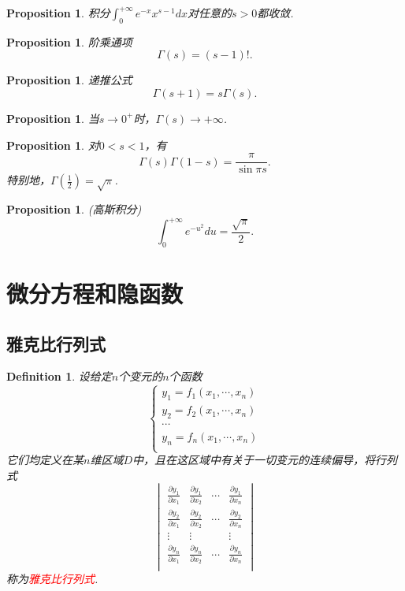 \documentclass{article}
\newtheorem{proposition}[theorem]{Proposition}
\newtheorem{definition}[theorem]{Definition}
\newcommand{\redt}[1]{\textcolor{red}{#1}}
\begin{document}
\begin{proposition}
\rm 积分$\int_0^{+\infty} e^{-x}x^{s-1}dx$对任意的$s > 0$都收敛.
\end{proposition}

\begin{proposition}
\rm 阶乘通项
$$		
\Gamma(s) = (s-1)!. 
$$
\end{proposition}

\begin{proposition}
\rm 递推公式
$$
\Gamma(s+1) = s\Gamma(s). 
$$
\end{proposition}

\begin{proposition}
\rm 当$s \rightarrow 0^+$时，$\Gamma(s) \rightarrow +\infty$.
\end{proposition}

\begin{proposition}
\rm 对$0<s<1$，有
$$
\Gamma(s)\Gamma(1-s) = \frac{\pi}{\sin \pi s}. 
$$
特别地，$\Gamma(\frac{1}{2})=\sqrt{\pi}$.
\end{proposition}

\begin{proposition}
\rm {\color{red} (高斯积分)}
$$
\int_0^{+\infty} e^{-u^2} du = \frac{\sqrt{\pi}}{2}.
$$
\end{proposition}

\newpage
\section{微分方程和隐函数}

\subsection{雅克比行列式}

\begin{definition}
\rm 设给定$n$个变元的$n$个函数
$$
\left \{
\begin{array}{ll}
y_1 = f_1(x_1,\cdots,x_n)\\
y_2 = f_2(x_1,\cdots,x_n)\\
\cdots \\
y_n = f_n(x_1,\cdots,x_n)\\
\end{array} \right.
$$
它们均定义在某$n$维区域$D$中，且在这区域中有关于一切变元的连续偏导，将行列式
$$
\begin{vmatrix}
\frac{\partial y_1}{\partial x_1} & \frac{\partial y_1}{\partial x_2} &\cdots &\frac{\partial y_1}{\partial x_n} \\
\frac{\partial y_2}{\partial x_1} & \frac{\partial y_2}{\partial x_2} &\cdots & \frac{\partial y_2}{\partial x_n} \\
\vdots &  \vdots & &\vdots \\
\frac{\partial y_n}{\partial x_1} & \frac{\partial y_n}{\partial x_2} &\cdots &\frac{\partial y_n}{\partial x_n} \\
\end{vmatrix}
$$
称为\redt{雅克比行列式}.
\end{definition}
\end{document}
